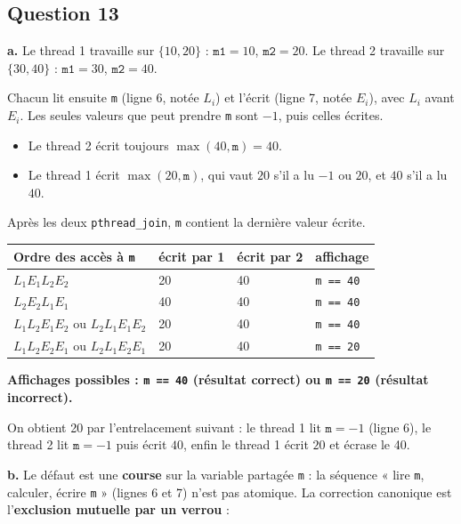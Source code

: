 \documentclass[11pt,a4paper]{article}
\providecommand{\tightlist}{\setlength{\itemsep}{0pt}\setlength{\parskip}{0pt}}
\begin{document}
\hypertarget{question-13}{%
\subsection{Question 13}\label{question-13}}

\textbf{a.} Le thread 1 travaille sur \(\{10,20\}\) : \(\texttt{m1}=10\), \(\texttt{m2}=20\). Le thread 2 travaille sur \(\{30,40\}\) : \(\texttt{m1}=30\), \(\texttt{m2}=40\).

Chacun lit ensuite \texttt{m} (ligne 6, notée \(L_i\)) et l'écrit (ligne 7, notée \(E_i\)), avec \(L_i\) avant \(E_i\). Les seules valeurs que peut prendre \texttt{m} sont \(-1\), puis celles écrites.

\begin{itemize}
\tightlist
\item
  Le thread 2 écrit toujours \(\max(40,\texttt m)=40\).
\item
  Le thread 1 écrit \(\max(20,\texttt m)\), qui vaut \(20\) s'il a lu \(-1\) ou \(20\), et \(40\) s'il a lu \(40\).
\end{itemize}

Après les deux \texttt{pthread\_join}, \texttt{m} contient la dernière valeur écrite.

\begin{longtable}[]{@{}llll@{}}
\toprule\noalign{}
Ordre des accès à \texttt{m} & écrit par 1 & écrit par 2 & affichage \\
\midrule\noalign{}
\endhead
\bottomrule\noalign{}
\endlastfoot
\(L_1E_1L_2E_2\) & 20 & 40 & \texttt{m\ ==\ 40} \\
\(L_2E_2L_1E_1\) & 40 & 40 & \texttt{m\ ==\ 40} \\
\(L_1L_2E_1E_2\) ou \(L_2L_1E_1E_2\) & 20 & 40 & \texttt{m\ ==\ 40} \\
\(L_1L_2E_2E_1\) ou \(L_2L_1E_2E_1\) & 20 & 40 & \texttt{m\ ==\ 20} \\
\end{longtable}

\textbf{Affichages possibles : \texttt{m\ ==\ 40} (résultat correct) ou \texttt{m\ ==\ 20} (résultat incorrect).}

On obtient 20 par l'entrelacement suivant : le thread 1 lit \(\texttt m=-1\) (ligne 6), le thread 2 lit \(\texttt m=-1\) puis écrit \(40\), enfin le thread 1 écrit \(20\) et écrase le 40.

\textbf{b.} Le défaut est une \textbf{course} sur la variable partagée \texttt{m} : la séquence « lire \texttt{m}, calculer, écrire \texttt{m} » (lignes 6 et 7) n'est pas atomique. La correction canonique est l'\textbf{exclusion mutuelle par un verrou} :
\end{document}
